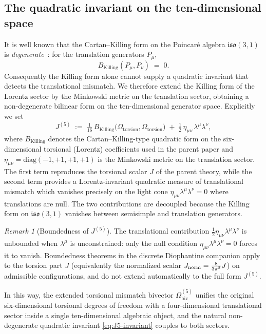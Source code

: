 \documentclass[dvipdfmx,a4paper]{article}
\theoremstyle{definition}
\theoremstyle{plain}
\theoremstyle{remark}
\newtheorem{remark}{Remark}
\begin{document}
\subsection{The quadratic invariant on the ten-dimensional space}

It is well known that the Cartan--Killing form on the Poincar\'{e} algebra \(\mathfrak{iso}(3,1)\) is \emph{degenerate}~\cite{FultonHarris1991,Humphreys1972}: for the translation generators \(P_{\mu}\),
\[
B_{\text{Killing}}(P_{\mu},P_{\nu})\;=\;0.
\]
Consequently the Killing form alone cannot supply a quadratic invariant that detects the translational mismatch. We therefore extend the Killing form of the Lorentz sector by the Minkowski metric on the translation sector, obtaining a non-degenerate bilinear form on the ten-dimensional generator space. Explicitly we set
\begin{equation}
\boxed{\;
J^{(5)}
\;:=\;
\tfrac{1}{16}\,B_{\text{Killing}}\!\bigl(\Omega_{\text{torsion}},\Omega_{\text{torsion}}\bigr)
\;+\;
\tfrac{1}{2}\,\eta_{\mu\nu}\,\lambda^{\mu}\lambda^{\nu},
\;}
\label{eq:J5-invariant}
\end{equation}
where \(B_{\text{Killing}}\) denotes the Cartan--Killing-type quadratic form on the six-dimensional torsional (Lorentz) coefficients used in the parent paper and \(\eta_{\mu\nu}=\mathrm{diag}(-1,+1,+1,+1)\) is the Minkowski metric on the translation sector. The first term reproduces the torsional scalar \(J\) of the parent theory, while the second term provides a Lorentz-invariant quadratic measure of translational mismatch which vanishes precisely on the light cone \(\eta_{\mu\nu}\lambda^{\mu}\lambda^{\nu}=0\) where translations are null. The two contributions are decoupled because the Killing form on \(\mathfrak{iso}(3,1)\) vanishes between semisimple and translation generators.

\begin{remark}[Boundedness of \(J^{(5)}\)]
\label{rem:J5-bounded}
The translational contribution \(\tfrac{1}{2}\eta_{\mu\nu}\lambda^{\mu}\lambda^{\nu}\) is unbounded when \(\lambda^{\mu}\) is unconstrained: only the null condition \(\eta_{\mu\nu}\lambda^{\mu}\lambda^{\nu}=0\) forces it to vanish. Boundedness theorems in the discrete Diophantine companion apply to the torsion part \(J\) (equivalently the normalized scalar \(J_{\rm norm}=\frac{8}{3\pi^2}J\)) on admissible configurations, and do not extend automatically to the full form \(J^{(5)}\).
\end{remark}

In this way, the extended torsional mismatch bivector \(\Omega_{\text{biv}}^{(5)}\) unifies the original six-dimensional torsional degrees of freedom with a four-dimensional translational sector inside a single ten-dimensional algebraic object, and the natural non-degenerate quadratic invariant \eqref{eq:J5-invariant} couples to both sectors.
\end{document}
